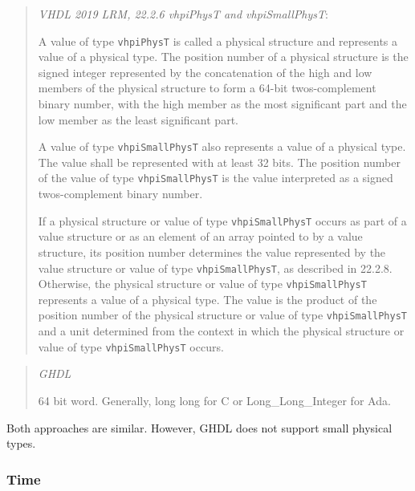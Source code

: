 \documentclass[
]{article}
\begin{document}
\begin{quote}
\emph{VHDL 2019 LRM, 22.2.6 vhpiPhysT and vhpiSmallPhysT}:

A value of type \texttt{vhpiPhysT} is called a physical structure and represents a value of a physical type.
The position number of a physical structure is the signed integer represented by the concatenation of the high and low members of the physical structure to form a 64-bit twos-complement binary number, with the high member as the most significant part and the low member as the least significant part.

A value of type \texttt{vhpiSmallPhysT} also represents a value of a physical type.
The value shall be represented with at least 32 bits. The position number of the value of type \texttt{vhpiSmallPhysT} is the value interpreted as a signed twos-complement binary number.

If a physical structure or value of type \texttt{vhpiSmallPhysT} occurs as part of a value structure or as an element of an array pointed to by a value structure, its position number determines the value represented by the value structure or value of type \texttt{vhpiSmallPhysT}, as described in 22.2.8. Otherwise, the physical structure or value of type \texttt{vhpiSmallPhysT} represents a value of a physical type. The value is the product of the position number of the physical structure or value of type \texttt{vhpiSmallPhysT} and a unit determined from the context in which the physical structure or value of type \texttt{vhpiSmallPhysT} occurs.
\end{quote}

\begin{quote}
\emph{GHDL}

64 bit word. Generally, long long for C or Long\_Long\_Integer for Ada.
\end{quote}

Both approaches are similar. However, GHDL does not support small physical types.

\hypertarget{time}{%
\subsubsection{Time}\label{time}}
\end{document}
